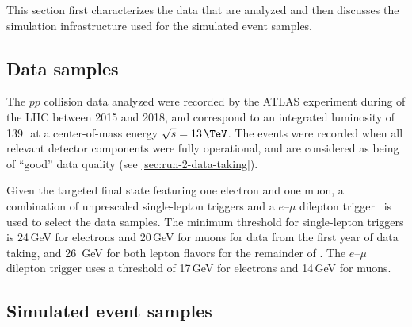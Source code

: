 %


\newcommand{\quotebox}[1]{
\begin{mdframed}[backgroundcolor=blue!8!gray!8,rightline=false,leftline=false,topline=false,bottomline=false]
{\LARGE``}{#1}{{\LARGE''}}~\cite{HWWPaper}
\end{mdframed}
}

This section first characterizes the data that are analyzed and then discusses the simulation infrastructure used for the simulated event samples.

\subsection{Data samples}
\label{subsec:data-samples}
The $pp$ collision data analyzed were recorded by the ATLAS experiment during \RunTwo of the LHC between 2015 and 2018, and correspond to an integrated luminosity of 139\,\ifb\ at a center-of-mass energy $\sqrt{s} = 13\,\TeV$.
The events were recorded when all relevant detector components were fully operational, and are considered as being of ``good'' data quality (see \cref{sec:run-2-data-taking}).

Given the targeted final state featuring one electron and one muon, a combination of unprescaled single-lepton triggers and a $e$--$\mu$ dilepton trigger~\cite{TRIG-2018-05,TRIG-2018-01} is used to select the data samples.
The minimum \pT threshold for single-lepton triggers is 24\,GeV for electrons and 20\,GeV for muons for data from the first year of data taking, and 26~GeV for both lepton flavors for the remainder of \RunTwo.
The $e$--$\mu$ dilepton trigger uses a \pT threshold of 17\,GeV for electrons and 14\,GeV for muons.

\subsection{Simulated event samples}
\label{subsec:simulated-event-samples}

